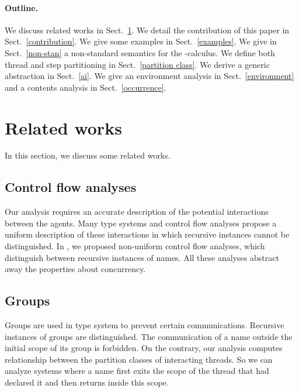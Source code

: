 \documentclass{article}
\newcommand{\picalcul}{-calculus}
\begin{document}
\paragraph{Outline.}
We discuss related works in Sect.~\ref{related}.
We detail the contribution of this paper in Sect.~\ref{contribution}.
We give some examples in Sect.~\ref{examples}.
We give in Sect.~\ref{non-stan} a non-standard semantics for the \picalcul.
We define  both thread and step partitioning in Sect.~\ref{partition class}.
We derive a generic abstraction in Sect.~\ref{ai}.
We give an environment analysis in Sect.~\ref{environment}  
and a contents analysis in Sect.~\ref{occurrence}. 


\section{Related works}
\label{related}
In this section, we discuss some related works. 
\subsection{Control flow analyses} 
Our analysis requires an accurate description of the potential interactions between the agents. Many type systems \cite{hennessy.riely:resource-access} and control flow analyses \cite{nielson:journal,nielson:concur98} propose a uniform description of these interactions in which recursive instances cannot be distinguished. In \cite{feret:jlap,feret:sas2000,feret:esop2002}, we proposed non-uniform control flow analyses, which distinguish between recursive instances of names. 
All these analyses abstract away the properties about concurrency.
\subsection{Groups}
Groups \cite{cardelli00secrecy,cardelli00ambient} are used in type system to prevent certain communications.
Recursive instances of groups are distinguished. The communication of a name outside the initial scope of its group is forbidden. 
On the contrary, our analysis computes relationship between the partition classes of interacting threads. So we can analyze systems where a name first exits the scope of the thread that had declared it and then returns inside this scope.  
\end{document}
